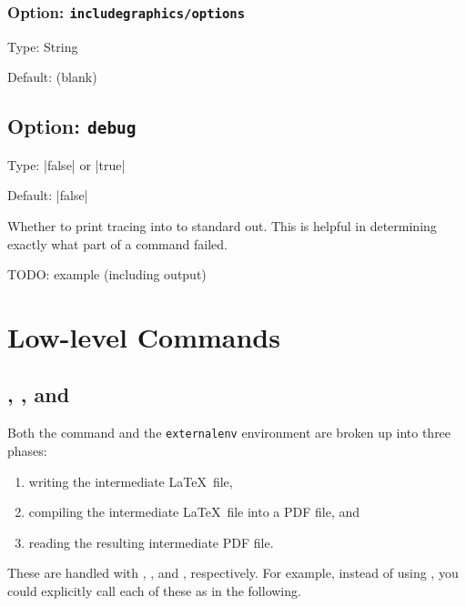 \documentclass[10pt]{ltxdoc}
\newcommand{\env}[1]{\texttt{#1}}
\newcommand{\opt}[1]{\texttt{#1}}
\begin{document}
\subsubsection{Option: \opt{includegraphics/options}}
\label{subsubsec:includegraphics/options}

Type: String

Default: (blank)

\subsection{Option: \opt{debug}}
\label{subsec:debug}

Type: |false| or |true|

Default: |false|

Whether to print tracing into to standard out.
This is helpful in determining exactly what part of a command failed.

TODO: example (including output)

\section{Low-level Commands}
\label{sec:Low-level Commands}

\subsection{, , and }
\label{subsec:ExternalWrite, ExternalCompile, and ExternalRead}




Both the  command and the \env{externalenv} environment
are broken up into three phases:
\begin{enumerate}
\item writing the intermediate \LaTeX\ file,
\item compiling the intermediate \LaTeX\ file into a PDF file, and
\item reading the resulting intermediate PDF file.
\end{enumerate}

These are handled with , , and
, respectively.
For example, instead of using , you could explicitly call
each of these as in the following.
\end{document}
